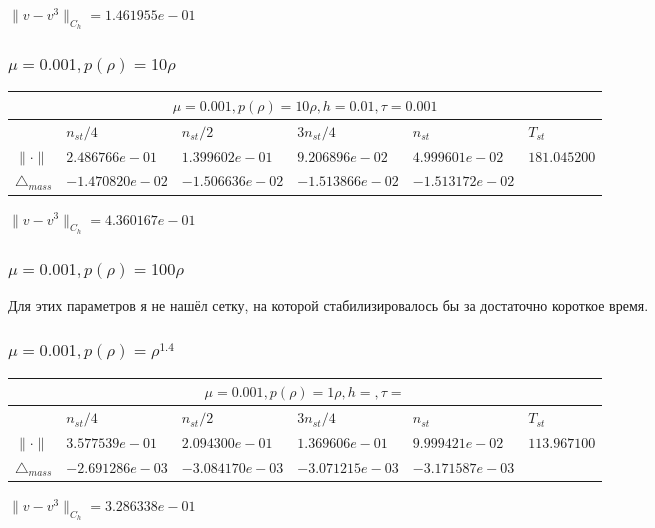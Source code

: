 $\|v-v^{3}\|_{C_h} = 1.461955e-01$

\subsubsection{$\mu = 0.001, p(\rho) = 10\rho $}

\begin{tabular}{*{6}{|l}|}
    \hline
     \\
    \hline
    &$n_{st}/4 $&$ n_{st}/2$&$3n_{st}/4$&$n_{st}$&$T_{st}$ \\
    \hline
$\|\cdot \|$& $2.486766e-01$ & $1.399602e-01$ & $9.206896e-02$ & $4.999601e-02$ &$181.045200$\\
\hline
$\triangle_{mass}$& $-1.470820e-02$ & $-1.506636e-02$ & $-1.513866e-02$ & $-1.513172e-02$ &\\
\hline
\end{tabular}

$\|v-v^{3}\|_{C_h} = 4.360167e-01$

\subsubsection{$\mu = 0.001, p(\rho) = 100\rho $}
Для этих параметров я не нашёл сетку, на которой стабилизировалось бы за достаточно короткое время.

\subsubsection{$\mu = 0.001, p(\rho) = \rho^{1.4} $}

\begin{tabular}{*{6}{|l}|}
    \hline
     \\
    \hline
    &$n_{st}/4 $&$ n_{st}/2$&$3n_{st}/4$&$n_{st}$&$T_{st}$ \\
    \hline
$\|\cdot \|$& $3.577539e-01$ & $2.094300e-01$ & $1.369606e-01$ & $9.999421e-02$ &$113.967100$\\
\hline
$\triangle_{mass}$& $-2.691286e-03$ & $-3.084170e-03$ & $-3.071215e-03$ & $-3.171587e-03$ &\\
\hline
\end{tabular}

$\|v-v^{3}\|_{C_h} = 3.286338e-01$
\newpage
